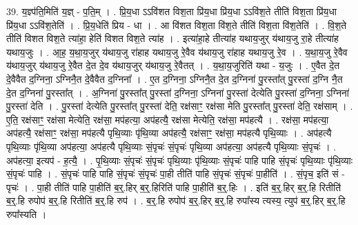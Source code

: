 \documentclass[17pt]{extarticle}
\begin{document}
39. य॒ज्ञ्प॑ति॒मिति॑ य॒ज्ञ् - प॒ति॒म् । . प्रि॒य॒धा ऽऽवि॑शत विश॒ता प्रि॑य॒धा प्रि॑य॒धा ऽऽवि॑श॒ते तीति॑ विश॒ता प्रि॑य॒धा प्रि॑य॒धा ऽऽवि॑श॒तेति॑ । . प्रि॒य॒धेति॑ प्रिय - धा । . आ वि॑शत विश॒ता वि॑श॒ते तीति॑ विश॒ता वि॑श॒तेति॑ । . वि॒श॒ते तीति॑ विशत विश॒ते त्या॑हा॒ हेति॑ विशत विश॒ते त्या॑ह । . इत्या॑हा॒हे तीत्या॑ह यथाय॒जुर् य॑थाय॒जु रा॒हे तीत्या॑ह यथाय॒जुः । . आ॒ह॒ य॒था॒य॒जुर् य॑थाय॒जु रा॑हाह यथाय॒जु रे॒वैव य॑थाय॒जु रा॑हाह यथाय॒जु रे॒व । . य॒था॒य॒जु रे॒वैव य॑थाय॒जुर् य॑थाय॒जु रे॒वैत दे॒त दे॒व य॑थाय॒जुर् य॑थाय॒जु रे॒वैतत् । . य॒था॒य॒जुरिति॑ यथा - य॒जुः । . ए॒वैत दे॒त दे॒वैवैत द॒ग्निना॒ ऽग्निनै॒त दे॒वैवैत द॒ग्निना᳚ । . ए॒त द॒ग्निना॒ ऽग्निनै॒त दे॒त द॒ग्निना॑ पु॒रस्ता᳚त् पु॒रस्ता॑ द॒ग्नि नै॒त दे॒त द॒ग्निना॑ पु॒रस्ता᳚त् । . अ॒ग्निना॑ पु॒रस्ता᳚त् पु॒रस्ता॑ द॒ग्निना॒ ऽग्निना॑ पु॒रस्ता॑ देत्येति पु॒रस्ता॑ द॒ग्निना॒ ऽग्निना॑ पु॒रस्ता॑ देति । . पु॒रस्ता॑ देत्येति पु॒रस्ता᳚त् पु॒रस्ता॑ देति॒ रक्ष॑साꣳ॒॒ रक्ष॑सा मेति पु॒रस्ता᳚त् पु॒रस्ता॑ देति॒ रक्ष॑साम् । . ए॒ति॒ रक्ष॑साꣳ॒॒ रक्ष॑सा मेत्येति॒ रक्ष॑सा॒ मप॑हत्या॒ अप॑हत्यै॒ रक्ष॑सा मेत्येति॒ रक्ष॑सा॒ मप॑हत्यै । . रक्ष॑सा॒ मप॑हत्या॒ अप॑हत्यै॒ रक्ष॑साꣳ॒॒ रक्ष॑सा॒ मप॑हत्यै पृथि॒व्याः पृ॑थि॒व्या अप॑हत्यै॒ रक्ष॑साꣳ॒॒ रक्ष॑सा॒ मप॑हत्यै पृथि॒व्याः । . अप॑हत्यै पृथि॒व्याः पृ॑थि॒व्या अप॑हत्या॒ अप॑हत्यै पृथि॒व्याः सं॒पृचः॑ सं॒पृचः॑ पृथि॒व्या अप॑हत्या॒ अप॑हत्यै पृथि॒व्याः सं॒पृचः॑ । . अप॑हत्या॒ इत्यप॑ - ह॒त्यै॒ । . पृ॒थि॒व्याः सं॒पृचः॑ सं॒पृचः॑ पृथि॒व्याः पृ॑थि॒व्याः सं॒पृचः॑ पाहि पाहि सं॒पृचः॑ पृथि॒व्याः पृ॑थि॒व्याः सं॒पृचः॑ पाहि । . सं॒पृचः॑ पाहि पाहि सं॒पृचः॑ सं॒पृचः॑ पा॒ही तीति॑ पाहि सं॒पृचः॑ सं॒पृचः॑ पा॒हीति॑ । . सं॒पृच॒ इति॑ सं - पृचः॑ । . पा॒ही तीति॑ पाहि पा॒हीति॑ ब॒र्॒.हिर् ब॒र्॒.हिरिति॑ पाहि पा॒हीति॑ ब॒र्॒.हिः । . इति॑ ब॒र्॒.हिर् ब॒र्॒.हि रितीति॑ ब॒र्॒.हि रुपोप॑ ब॒र्॒.हि रितीति॑ ब॒र्॒.हि रुप॑ । . ब॒र्॒.हि रुपोप॑ ब॒र्॒.हिर् ब॒र्॒.हि रुपा᳚स्य त्यस्य॒ त्युप॑ ब॒र्॒.हिर् ब॒र्॒.हि रुपा᳚स्यति । \newline
\pagebreak
{}
\end{document}
